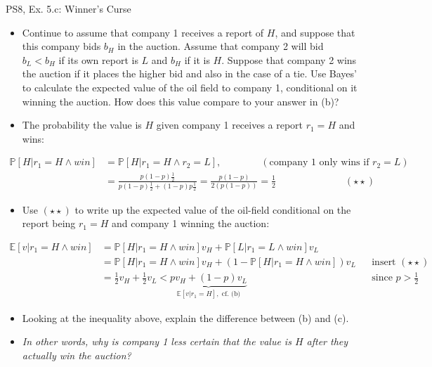 \begin{frame}{PS8, Ex. 5.c: Winner's Curse}
      \begin{itemize}
        \item[(c)] Continue to assume that company 1 receives a report of $H$, and suppose that this company bids $b_H$ in the auction. Assume that company 2 will bid $b_L < b_H$ if its own report is $L$ and $b_H$ if it is $H$. Suppose that company 2 wins the auction if it places the higher bid and also in the case of a tie. Use Bayes’ to calculate the expected value of the oil field to company 1, conditional on it winning the auction. How does this value compare to your answer in (b)?
        \item[Step 1:] The probability the value is $H$ given company 1 receives a report $r_1=H$ and wins:
        \end{itemize}
        \vspace{-8pt}
        \begin{align*}
          \mathbb{P}[H|r_1=H\wedge win]&=\mathbb{P}[H|r_1=H\wedge r_2=L],\quad\quad\quad\quad(\text{company 1 only wins if }r_2=L)\\
            &=\frac{p(1-p)\frac{1}{2}}{p(1-p)\frac{1}{2}+(1-p)p\frac{1}{2}}=\frac{p(1-p)}{2(p(1-p))}=\frac{1}{2}\quad\quad\quad\quad\quad\quad\quad(\star\star)
        \end{align*}
        \vspace{-8pt}
        \begin{itemize}
        \item[Step 2:] Use $(\star\star)$ to write up the expected value of the oil-field conditional on the report being $r_1=H$ and company 1 winning the auction:
      \end{itemize}
      \vspace{-4pt}
      \begin{align*}
        \mathbb{E}[v|r_1=H\wedge win]&=\mathbb{P}[H|r_1=H\wedge win]v_H+\mathbb{P}[L|r_1=L\wedge win]v_L\\
        &=\mathbb{P}[H|r_1=H\wedge win]v_H+\left(1-\mathbb{P}[H|r_1=H\wedge win]\right)v_L&&\text{insert }(\star\star)\\
        &=\frac{1}{2}v_H+\frac{1}{2}v_L<\underbrace{pv_H+(1-p)v_L}_{\textstyle\mathbb{E}[v|r_1=H],\text{ cf. (b)}}&&\text{since }p>\frac{1}{2}
      \end{align*}
      \vspace{-10pt}
      \begin{itemize}
        \item[Step 3:] Looking at the inequality above, explain the difference between (b) and (c).
        \item[]        \textit{In other words, why is company 1 less certain that the value is $H$ after they actually win the auction?}
      \end{itemize}
      \vfill\null
\end{frame}
